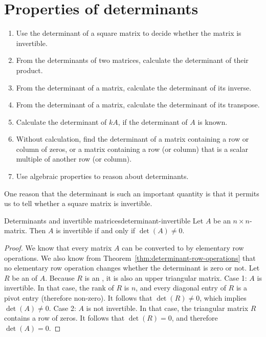 \section{Properties of determinants}

\begin{outcome}
  \begin{enumerate}
  \item Use the determinant of a square matrix to decide whether the
    matrix is invertible.
  \item From the determinants of two matrices, calculate the
    determinant of their product. 
  \item From the determinant of a matrix, calculate the determinant of
    its inverse.
  \item From the determinant of a matrix, calculate the determinant of
    its transpose.
  \item Calculate the determinant of $kA$, if the determinant of $A$
    is known.
  \item Without calculation, find the determinant of a matrix
    containing a row or column of zeros, or a matrix containing a row
    (or column) that is a scalar multiple of another row (or column).
  \item Use algebraic properties to reason about determinants.
  \end{enumerate}
\end{outcome}

One reason that the determinant is such an important quantity is that
it permits us to tell whether a square matrix is invertible.

\begin{theorem}{Determinants and invertible matrices}{determinant-invertible}
  Let $A$ be an $n\times n$-matrix. Then $A$ is invertible%
   if and
  only if $\det(A) \neq 0$.
\end{theorem}

\begin{proof}
  We know that every matrix $A$ can be converted to {\ef} by
  elementary row operations. We also know from
  Theorem~\ref{thm:determinant-row-operations} that no elementary row
  operation changes whether the determinant is zero or not.  Let $R$
  be an {\ef} of $A$. Because $R$ is an {\ef}, it is also an upper
  triangular matrix. Case 1: $A$ is invertible. In that case, the rank
  of $R$ is $n$, and every diagonal entry of $R$ is a pivot entry
  (therefore non-zero). It follows that $\det(R)\neq 0$, which implies
  $\det(A)\neq 0$. Case 2: $A$ is not invertible. In that case, the
  triangular matrix $R$ contains a row of zeros. It follows that
  $\det(R)=0$, and therefore $\det(A)=0$.
\end{proof}

